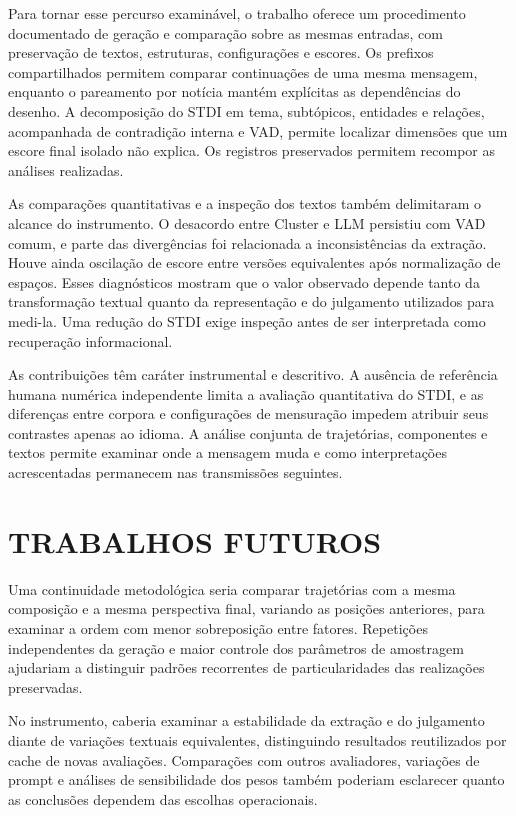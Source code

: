 Para tornar esse percurso examinável, o trabalho oferece um procedimento documentado de geração e comparação sobre as mesmas entradas, com preservação de textos, estruturas, configurações e escores. Os prefixos compartilhados permitem comparar continuações de uma mesma mensagem, enquanto o pareamento por notícia mantém explícitas as dependências do desenho. A decomposição do STDI em tema, subtópicos, entidades e relações, acompanhada de contradição interna e VAD, permite localizar dimensões que um escore final isolado não explica. Os registros preservados permitem recompor as análises realizadas.

As comparações quantitativas e a inspeção dos textos também delimitaram o alcance do instrumento. O desacordo entre Cluster e LLM persistiu com VAD comum, e parte das divergências foi relacionada a inconsistências da extração. Houve ainda oscilação de escore entre versões equivalentes após normalização de espaços. Esses diagnósticos mostram que o valor observado depende tanto da transformação textual quanto da representação e do julgamento utilizados para medi-la. Uma redução do STDI exige inspeção antes de ser interpretada como recuperação informacional.

As contribuições têm caráter instrumental e descritivo. A ausência de referência humana numérica independente limita a avaliação quantitativa do STDI, e as diferenças entre corpora e configurações de mensuração impedem atribuir seus contrastes apenas ao idioma. A análise conjunta de trajetórias, componentes e textos permite examinar onde a mensagem muda e como interpretações acrescentadas permanecem nas transmissões seguintes.

\section{TRABALHOS FUTUROS}
\label{sec:conclusao-futuros}

Uma continuidade metodológica seria comparar trajetórias com a mesma composição e a mesma perspectiva final, variando as posições anteriores, para examinar a ordem com menor sobreposição entre fatores. Repetições independentes da geração e maior controle dos parâmetros de amostragem ajudariam a distinguir padrões recorrentes de particularidades das realizações preservadas.

No instrumento, caberia examinar a estabilidade da extração e do julgamento diante de variações textuais equivalentes, distinguindo resultados reutilizados por cache de novas avaliações. Comparações com outros avaliadores, variações de prompt e análises de sensibilidade dos pesos também poderiam esclarecer quanto as conclusões dependem das escolhas operacionais.


